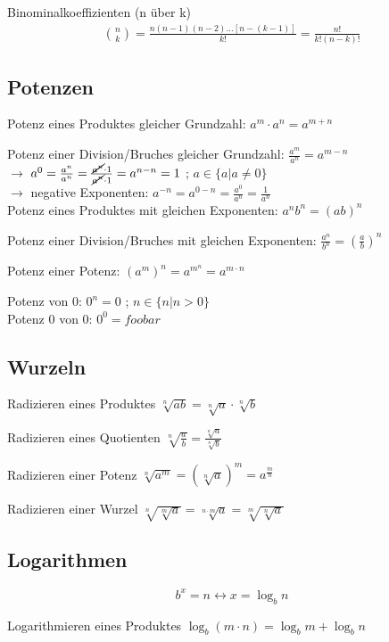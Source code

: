 \documentclass[12pt,a4paper,fleqn,twoside,pdf,final]{article}
\begin{document}
Binominalkoeffizienten (n über k)
\begin{align*}
\binom{n}{k}= \frac{n(n-1)(n-2)...[n-(k-1)] }{k!} =  \frac{n!}{k!(n-k)!}
\end{align*}

\subsection{Potenzen}
Potenz eines Produktes gleicher Grundzahl: 
$a^m \cdot a^n = a^{m+n}$

Potenz einer Division/Bruches gleicher Grundzahl: $ \frac{a^m}{a^n} = a^{m-n}$ \\
$\longrightarrow$ $ a^0 =  \frac{a^n}{a^n} =   \frac{ \cancel{a^n} \cdot 1}{ \cancel{a^n} \cdot 1} = a^{n-n}  = 1$  ; $a \in \{a| a \neq 0\}$ \\
$\longrightarrow$ negative Exponenten: $ a^{-n} =  a^{0-n} =  \frac{a^0}{a^n}  =  \frac{1}{a^n} $ \\

Potenz eines Produktes mit gleichen Exponenten: $ {a^n}{b^n} = (ab)^{n}$ 

Potenz einer Division/Bruches mit gleichen Exponenten: $ \frac{a^n}{b^n} = (\frac{a}{b}) ^n$ 

Potenz einer Potenz: $ (a^m)^n = a^{m^n} = a^{m \cdot n}$ 

Potenz von 0: $ 0^n = 0 $ ;  $n \in\{n | n > 0\}$\\
Potenz 0 von 0: $ 0^0 = foobar $ 

\subsection{Wurzeln}

Radizieren eines Produktes $\sqrt[n]{ab} = \sqrt[n]{a} \cdot \sqrt[n]{b}$

Radizieren eines Quotienten $\sqrt[n]{\frac{a}{b} } = \frac{\sqrt[n]{a}}{\sqrt[n]{b}} $

Radizieren einer Potenz $\sqrt[n]{ a^m} = (\sqrt[n]{ a})^m = a^{\frac{m}{n}}$

Radizieren einer Wurzel $\sqrt[n]{\sqrt[m]{a}}  = \sqrt[n \cdot m]{a} = \sqrt[m]{\sqrt[n]{a}}$


\subsection{Logarithmen}
$$ b^x =n \longleftrightarrow x = \log_b n$$

Logarithmieren eines Produktes $\log_b (m \cdot n) = \log_b m + \log_b n $ 
\end{document}
